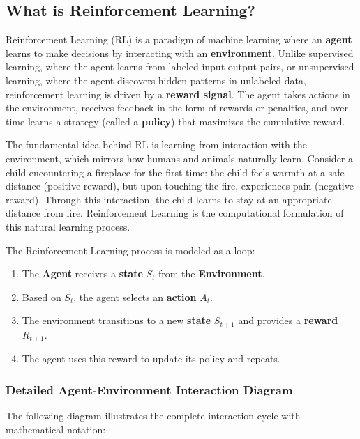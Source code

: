 \documentclass[11pt,a4paper]{article}
\begin{document}
\subsection{What is Reinforcement Learning?}

Reinforcement Learning (RL) is a paradigm of machine learning where an \textbf{agent} learns to make decisions by interacting with an \textbf{environment}. Unlike supervised learning, where the agent learns from labeled input-output pairs, or unsupervised learning, where the agent discovers hidden patterns in unlabeled data, reinforcement learning is driven by a \textbf{reward signal}. The agent takes actions in the environment, receives feedback in the form of rewards or penalties, and over time learns a strategy (called a \textbf{policy}) that maximizes the cumulative reward.

The fundamental idea behind RL is learning from interaction with the environment, which mirrors how humans and animals naturally learn. Consider a child encountering a fireplace for the first time: the child feels warmth at a safe distance (positive reward), but upon touching the fire, experiences pain (negative reward). Through this interaction, the child learns to stay at an appropriate distance from fire. Reinforcement Learning is the computational formulation of this natural learning process.

\begin{tcolorbox}[colback=blue!5!white,colframe=blue!75!black,title=\textbf{Key Insight: The RL Loop}]
The Reinforcement Learning process is modeled as a loop:
\begin{enumerate}
    \item The \textbf{Agent} receives a \textbf{state} $S_t$ from the \textbf{Environment}.
    \item Based on $S_t$, the agent selects an \textbf{action} $A_t$.
    \item The environment transitions to a new \textbf{state} $S_{t+1}$ and provides a \textbf{reward} $R_{t+1}$.
    \item The agent uses this reward to update its policy and repeats.
\end{enumerate}
\end{tcolorbox}

\subsubsection{Detailed Agent-Environment Interaction Diagram}

The following diagram illustrates the complete interaction cycle with mathematical notation:
\end{document}
